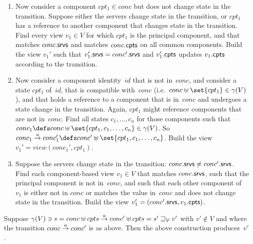 \begin{enumerate}
\item \label{case:view-principal-present-unchanged} Now consider a component
  $cpt_1 \in conc$ but does not change state in the transition.
  Suppose either the servers change state in the transition, or $cpt_1$ has a
  reference to another component that changes state in the transition.  Find
  every view $v_1 \in V$ for which $cpt_1$ is the principal component, and
  that matches $conc.\mathsf{srvs}$ and matches $conc.\mathsf{cpts}$ on all common components.
  Build the view $v_1'$ such that $v_1'.\mathsf{srvs} = conc'.\mathsf{srvs}$ and $v_1'.\mathsf{cpts}$
  updates $v_1.\mathsf{cpts}$ according to the transition.

\item \label{case:view-nonprincipal-component-changes} Now consider a
  component identity~$id$ that is not in~$conc$, and consider a state $cpt_1$
  of~$id$, that is compatible with~$conc$ (i.e.~$conc \uplus \set{cpt_1} \in
  \gamma(V)$), and that holds a reference to a component that is in~$conc$ and
  undergoes a state change in the transition.  Again, $cpt_1$ might reference
  components that are not in~$conc$.  Find all states $c_1, \ldots, c_n$ for
  those components such that $conc_1 \defs conc \uplus \set{cpt_1, c_1, \ldots,
    c_n} \in \gamma(V)$.  So $conc_1 \trans{a} conc_1' \defs conc' \uplus
  \set{cpt_1, c_1, \ldots, c_n}$.  Build the view $v_1' = view(conc_1',
  cpt_1)$.



\item \label{case:view-only-servers-change} Suppose the servers change state
  in the transition: $conc.\mathsf{srvs} \ne conc'.\mathsf{srvs}$.  Find each component-based
  view $v_1 \in V$ that matches $conc.\mathsf{srvs}$, such that the principal component
  is not in~$conc$, and such that each other component of~$v_1$ is either not
  in $conc$ or matches the value in~$conc$ and does not change state in the
  transition.  Build the view $v_1' = (conc'.\mathsf{srvs}, v_1.\mathsf{cpts})$.
\end{enumerate}


\begin{lemma}
Suppose $\gamma(V) \ni s = conc \uplus cpts \stackrel{a}\rightarrow conc' \uplus cpts = s'
\sqsupseteq_{\mathcal{V}} v'$ with $v' \nin V$ and where the transition $conc \stackrel{a}\rightarrow conc'$ is
as above.  Then the above construction produces~$v'$.
\end{lemma}

